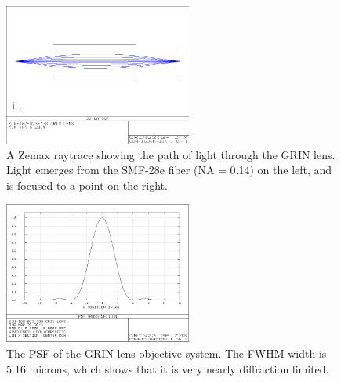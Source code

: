\begin{figure}[h!]
\centering
\includegraphics[width=0.55\textwidth]{Images/Zemax/GRO-raytrace.png}
\caption[A Zemax raytrace showing the path of light through the GRIN lens.]{A Zemax raytrace showing the path of light through the GRIN lens. Light emerges from the SMF-28e fiber (NA = 0.14) on the left, and is focused to a point on the right.}
\end{figure}

\begin{figure}[h!]
\centering
\includegraphics[width=0.55\textwidth]{Images/Zemax/GRIN_PSF.png}
\caption[The PSF of the GRIN lens objective system.]{The PSF of the GRIN lens objective system. The FWHM width is 5.16 microns, which shows that it is very nearly diffraction limited.}
\end{figure}

